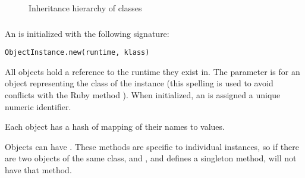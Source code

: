 \begin{figure}
\begin{center}
\caption{Inheritance hierarchy of  classes}
\label{fig:data_object_hierarchy}
\end{center}
\end{figure}

\subsubsection{}

An  is initialized with the following signature:

\begin{lstlisting}
ObjectInstance.new(runtime, klass)
\end{lstlisting}

All  objects hold a reference to the runtime they exist in. The  parameter is for an object representing the class of the instance (this spelling is used to avoid conflicts with the Ruby method ). When initialized, an  is assigned a unique numeric identifier.

Each object has a hash of  mapping of their names to values.

Objects can have . These methods are specific to individual instances, so if there are two objects of the same class,  and , and  defines a singleton method,  will not have that method.

